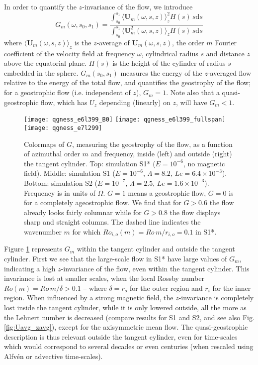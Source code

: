 \documentclass[12pt, a4paper]{article}
\begin{document}
In order to quantify the $z$-invariance of the flow, we introduce
\begin{equation}
G_m(\omega,s_0,s_1) = \frac{\int_{s_0}^{s_1} \langle\mathbf{U}_m(\omega,s,z)\rangle_z^2  H(s)\,s \mathrm{d} s }
					{\int_{s_0}^{s_1}\langle\mathbf{U}_m^2(\omega,s,z)\rangle_z  H(s)\,s \mathrm{d} s }
\end{equation}
where $\langle\mathbf{U}_m(\omega,s,z)\rangle_z$ is the $z$-average of $\mathbf{U}_m(\omega,s,z)$, the order $m$ Fourier coefficient of the velocity field at frequency $\omega$, cylindrical radius $s$ and distance $z$ above the equatorial plane.
$H(s)$ is the height of the cylinder of radius $s$ embedded in the sphere.
$G_m(s_0,s_1)$ measures the energy of the $z$-averaged flow relative to the energy of the total flow, and quantifies the geostrophy of the flow; for a geostrophic flow (i.e. independent of $z$), $G_m = 1$.
Note also that a quasi-geostrophic flow, which has $U_z$ depending (linearly) on $z$, will have $G_m < 1$.

\begin{figure}
\begin{center}
\texttt{[image: qgness\_e6l399\_B0]}
\texttt{[image: qgness\_e6l399\_fullspan]}
\texttt{[image: qgness\_e7l299]}
\caption{Colormaps of $G$, measuring the geostrophy of the flow, as a function of azimuthal order $m$ and frequency, inside (left) and outside (right) the tangent cylinder.
Top: simulation S1* ($E=10^{-6}$, no magnetic field).
Middle: simulation S1 ($E=10^{-6}$, $\Lambda=8.2$, $Le=6.4 \times 10^{-3}$).
Bottom: simulation S2 ($E=10^{-7}$, $\Lambda=2.5$, $Le=1.6 \times 10^{-3}$).
Frequency is in units of $\Omega$.
$G=1$ means a geostrophic flow, $G=0$ is for a completely ageostrophic flow.
We find that for $G>0.6$ the flow already looks fairly columnar while for $G>0.8$ the flow displays sharp and straight columns.
The dashed line indicates the wavenumber $m$ for which $Ro_{i,o}(m) = Ro\,m/r_{i,o} = 0.1$ in S1*.
}
\label{fig:qgness}
\end{center}
\end{figure}

Figure \ref{fig:qgness} represents $G_m$ within the tangent cylinder and outside the tangent cylinder.
First we see that the large-scale flow in S1* have large values of $G_m$, indicating a high $z$-invariance of the flow, even within the tangent cylinder.
This invariance is lost at smaller scales, when the local Rossby number $Ro(m) = Ro \, m/\delta > 0.1$ -- where $\delta = r_o$ for the outer region and $r_i$ for the inner region.
When influenced by a strong magnetic field, the $z$-invariance is completely lost inside the tangent cylinder, while it is only lowered outside, all the more as the Lehnert number is decreased (compare results for S1 and S2, and see also Fig. \ref{fig:Uavg_zavg}), except for the axisymmetric mean flow.
The quasi-geostrophic description \citep[where the flow dynamics is treated as invariant along the rotation axis, e.g.][]{schaeffer2006,gillet2011,labbe2015} is thus relevant outside the tangent cylinder, even for time-scales which would correspond to several decades or even centuries (when rescaled using Alfvén or advective time-scales).
\end{document}
